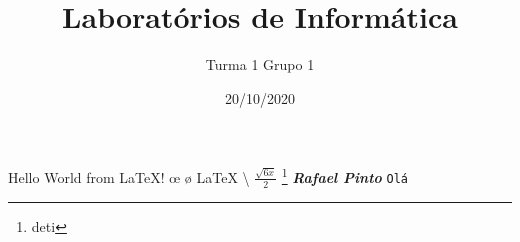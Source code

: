 \documentclass[11pt,a4paper,openright,twoside]{report}
\title{\textbf{Laboratórios de Informática}}
\author{Turma 1 Grupo 1}
\date{20/10/2020}
\begin{document}
\maketitle
Hello World from \LaTeX!
{\oe} {\o} {\LaTeX}
\textbackslash
$\frac{\sqrt{6x}}{2}$
\footnote{deti}
\textbf{\textit{Rafael Pinto}}
\texttt{Olá}
\end{document}
